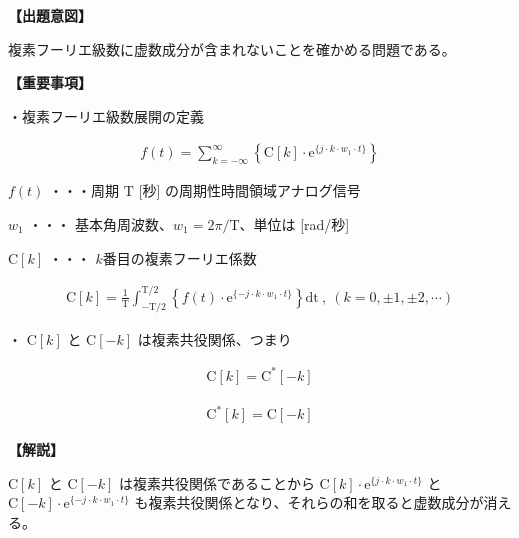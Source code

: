 \noindent \textbf{【出題意図】}

\bigskip
\noindent 複素フーリエ級数に虚数成分が含まれないことを確かめる問題である。

\vspace{1em}
\noindent \textbf{【重要事項】}

\medskip
\noindent ・複素フーリエ級数展開の定義

\begin{align*}
f(t) = \sum_{k = -\infty}^{\infty} 
\left \{
\textrm{C}[k] \cdot \textrm{e}^{\{j \cdot k \cdot w_1 \cdot t \}}
\right \}
\end{align*}

\medskip
\noindent $f(t)$ ・・・周期 $\textrm{T}$ [秒] の周期性時間領域アナログ信号

\medskip
\noindent $w_1$ ・・・ 基本角周波数、$w_1 = 2\pi/\textrm{T}$、単位は [rad/秒]

\medskip
\noindent $\textrm{C}[k]$ ・・・ $k$番目の複素フーリエ係数

\begin{align*}
\textrm{C}[k] = \frac{1}{\textrm{T}} \int_{-\textrm{T}/2}^{\textrm{T}/2} 
\left \{
f(t) \cdot \textrm{e}^{\{-j \cdot k \cdot w_1 \cdot t \}} 
\right \}
\textrm{dt}
\ ,\  (k = 0, \pm 1, \pm 2, \cdots)
\end{align*}

\bigskip
\noindent ・ $\textrm{C}[k]$ と $\textrm{C}[-k]$ は複素共役関係、つまり

\begin{align*}
\textrm{C}[k] = \textrm{C}^{*}[-k]
\end{align*}

\begin{align*}
\textrm{C}^{*}[k] = \textrm{C}[-k]
\end{align*}

\bigskip

\vspace{1em}
\noindent \textbf{【解説】}

\bigskip
\noindent $\textrm{C}[k]$ と $\textrm{C}[-k]$ は複素共役関係であることから
$\textrm{C}[k] \cdot \textrm{e}^{\{j \cdot k \cdot w_1 \cdot t \}} $
と
$\textrm{C}[-k] \cdot \textrm{e}^{\{-j \cdot k \cdot w_1 \cdot t \}} $
も複素共役関係となり、それらの和を取ると虚数成分が消える。
